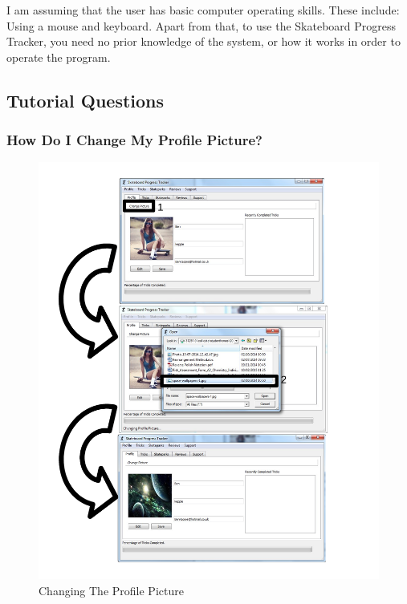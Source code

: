 I am assuming that the user has basic computer operating skills. These include: Using a mouse and keyboard. Apart from that, to use the Skateboard Progress Tracker, you need no prior knowledge of the system, or how it works in order to operate the program.

\subsection{Tutorial Questions}

\subsubsection{How Do I Change My Profile Picture?}

\begin{figure}[H]
    \includegraphics[width=\textwidth]{./Manual/Images/SaveProfilePicture.pdf}
    \caption{Changing The Profile Picture} \label{fig:Change Profile Picture}
\end{figure}

